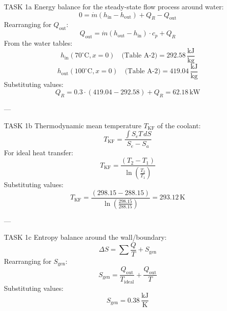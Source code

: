 TASK 1a  
Energy balance for the steady-state flow process around water:  
\[
0 = \dot{m} (h_{\text{in}} - h_{\text{out}}) + Q_R - Q_{\text{out}}
\]  
Rearranging for \( Q_{\text{out}} \):  
\[
Q_{\text{out}} = \dot{m} (h_{\text{out}} - h_{\text{in}}) \cdot c_p + Q_R
\]  
From the water tables:  
\[
h_{\text{in}}(70^\circ\text{C}, x=0) \quad \text{(Table A-2)} = 292.58 \, \frac{\text{kJ}}{\text{kg}}
\]  
\[
h_{\text{out}}(100^\circ\text{C}, x=0) \quad \text{(Table A-2)} = 419.04 \, \frac{\text{kJ}}{\text{kg}}
\]  
Substituting values:  
\[
Q_R = 0.3 \cdot (419.04 - 292.58) + Q_R = 62.18 \, \text{kW}
\]  

---

TASK 1b  
Thermodynamic mean temperature \( T_{\text{KF}} \) of the coolant:  
\[
T_{\text{KF}} = \frac{\int S_e T \, dS}{S_e - S_a}
\]  
For ideal heat transfer:  
\[
T_{\text{KF}} = \frac{(T_2 - T_1)}{\ln \left( \frac{T_2}{T_1} \right)}
\]  
Substituting values:  
\[
T_{\text{KF}} = \frac{(298.15 - 288.15)}{\ln \left( \frac{298.15}{288.15} \right)} = 293.12 \, \text{K}
\]  

---

TASK 1c  
Entropy balance around the wall/boundary:  
\[
\Delta S = \sum \frac{Q}{T} + S_{\text{gen}}
\]  
Rearranging for \( S_{\text{gen}} \):  
\[
S_{\text{gen}} = \frac{Q_{\text{out}}}{T_{\text{ideal}}} + \frac{Q_{\text{out}}}{T}
\]  
Substituting values:  
\[
S_{\text{gen}} = 0.38 \, \frac{\text{kJ}}{\text{K}}
\]  